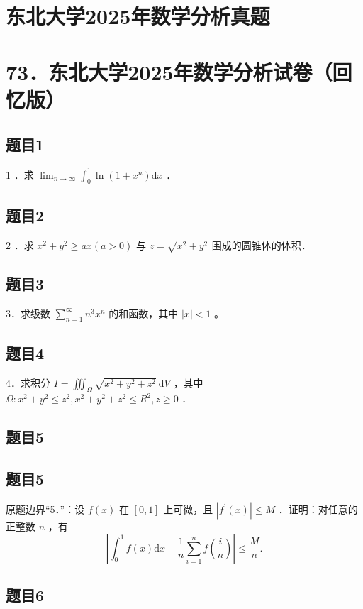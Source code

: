 \documentclass{article}
\begin{document}
\section*{东北大学2025年数学分析真题}
\section*{73．东北大学2025年数学分析试卷（回忆版）}

\subsection{题目1}
1 ．求 \(\lim _{n \rightarrow \infty} \int_{0}^{1} \ln \left(1+x^{n}\right) \mathrm{d} x\) ．

\subsection{题目2}
2 ．求 \(x^{2}+y^{2} \geq a x(a>0)\) 与 \(z=\sqrt{x^{2}+y^{2}}\) 围成的圆锥体的体积．

\subsection{题目3}
3．求级数 \(\sum_{n=1}^{\infty} n^{3} x^{n}\) 的和函数，其中 \(|x|<1\) 。

\subsection{题目4}
4．求积分 \(I=\iiint_{\Omega} \sqrt{x^{2}+y^{2}+z^{2}} \mathrm{~d} V\) ，其中 \(\Omega: x^{2}+y^{2} \leq z^{2}, x^{2}+y^{2}+z^{2} \leq R^{2}, z \geq 0\) ．

\begin{itemize}

\subsection{题目5}
\end{itemize}

\subsection{题目5}
原题边界“5．”：设 \(f(x)\) 在 \([0,1]\) 上可微，且 \(\left|f^{\prime}(x)\right| \leq M\) ．证明：对任意的正整数 \(n\) ，有
\[
\left|\int_{0}^{1} f(x) \mathrm{d} x-\frac{1}{n} \sum_{i=1}^{n} f\left(\frac{i}{n}\right)\right| \leq \frac{M}{n} .
\]

\subsection{题目6}
\end{document}
